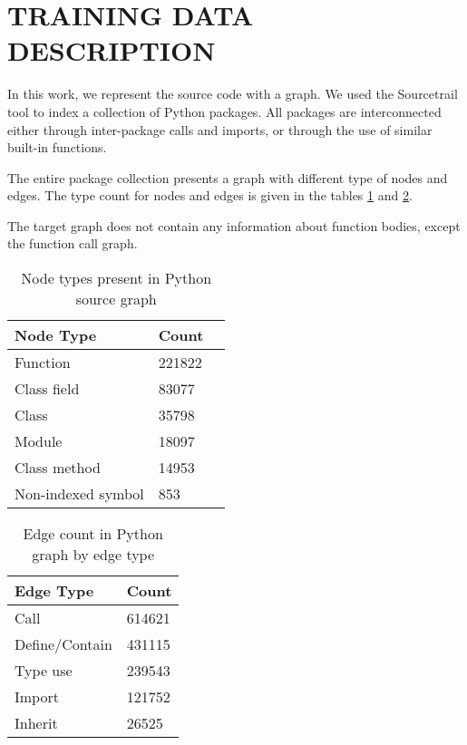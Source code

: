 \documentclass[a4paper,twoside]{article}
\begin{document}
\section{\uppercase{Training Data Description}}

In this work, we represent the source code with a graph. We used the Sourcetrail tool to index a collection of Python packages. All packages are interconnected either through inter-package calls and imports, or through the use of similar built-in functions. 

The entire package collection presents a graph with different type of nodes and edges. The type count for nodes and edges is given in the tables \ref{tbl:python_node_count} and \ref{tbl:python_edge_count}. 

The target graph does not contain any information about function bodies, except the function call graph.

\begin{table}[]
\centering
\begin{tabular}{|l|l|l|}
 \hline
Node Type        & Count  \\ \hline
Function        & 221822 \\ \hline
Class field     & 83077 \\ \hline
Class           & 35798 \\ \hline
Module          & 18097 \\ \hline
Class method    & 14953 \\ \hline
Non-indexed symbol  & 853  \\ \hline
\end{tabular}
\caption{Node types present in Python source graph \label{tbl:python_node_count}}
\end{table}

\begin{table}[]
\centering
\begin{tabular}{|l|l|}
\hline
Edge Type       & Count \\ \hline
Call            & 614621 \\ \hline
Define/Contain  & 431115 \\ \hline
Type use        & 239543 \\ \hline
Import          & 121752 \\ \hline
Inherit         & 26525 \\ \hline
\end{tabular}
\caption{Edge count in Python graph by edge type \label{tbl:python_edge_count}}
\end{table}
\end{document}
